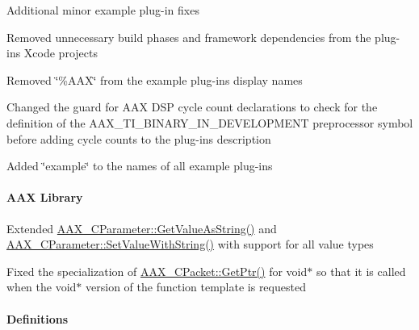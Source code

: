 \begin{DoxyItemize}
\item Additional minor example plug-\/in fixes 
\begin{DoxyItemize}
\item Removed unnecessary build phases and framework dependencies from the plug-\/ins\textquotesingle{} Xcode projects 
\item Removed \char`\"{}\%\+A\+A\+X\char`\"{} from the example plug-\/ins\textquotesingle{} display names 
\item Changed the guard for A\+A\+X D\+S\+P cycle count declarations to check for the definition of the {\ttfamily A\+A\+X\+\_\+\+T\+I\+\_\+\+B\+I\+N\+A\+R\+Y\+\_\+\+I\+N\+\_\+\+D\+E\+V\+E\+L\+O\+P\+M\+E\+N\+T} preprocessor symbol before adding cycle counts to the plug-\/in\textquotesingle{}s description 
\item Added \char`\"{}example\char`\"{} to the names of all example plug-\/ins 
\end{DoxyItemize}
\end{DoxyItemize}\hypertarget{a00375_aax_sdk_2p2p1_AAX_Library}{}\paragraph{A\+A\+X Library}\label{a00375_aax_sdk_2p2p1_AAX_Library}

\begin{DoxyItemize}
\item Extended \hyperlink{a00033_a7c5e951eb4c32b2993048acb414adc52}{A\+A\+X\+\_\+\+C\+Parameter\+::\+Get\+Value\+As\+String()} and \hyperlink{a00033_a0304e07f471e1a9dd804bbba7940281e}{A\+A\+X\+\_\+\+C\+Parameter\+::\+Set\+Value\+With\+String()} with support for all value types 
\item Fixed the specialization of \hyperlink{a00030_a4f9bbeedcad126dd34e797ac4c8fc736}{A\+A\+X\+\_\+\+C\+Packet\+::\+Get\+Ptr()} for {\ttfamily void$\ast$} so that it is called when the {\ttfamily void$\ast$} version of the function template is requested 
\end{DoxyItemize}\hypertarget{a00375_aax_sdk_2p2p1_Definitions}{}\paragraph{Definitions}\label{a00375_aax_sdk_2p2p1_Definitions}

